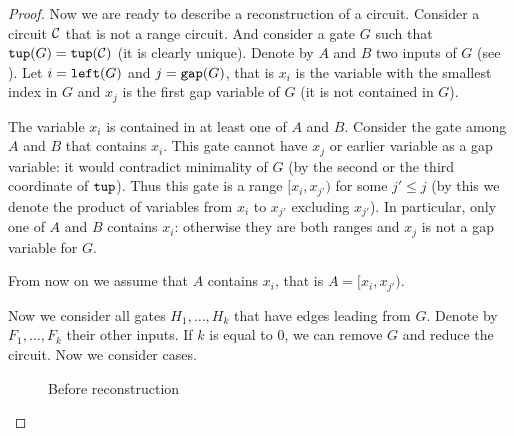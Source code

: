 \documentclass{toc}
\begin{document}
\begin{proof}[Proof]
    Now we are ready to describe a reconstruction of a circuit. Consider a circuit ${\cal C}$ that is not a range circuit. And consider a gate $G$ such that $\texttt{tup}(G)=\texttt{tup}({\cal C})$ (it is clearly unique). Denote by $A$ and $B$ two inputs of $G$ (see ). Let $i=\texttt{left}(G)$ and $j=\texttt{gap}(G)$, that is $x_i$ is the variable with the smallest index in $G$ and $x_j$ is the first gap variable of $G$ (it is not contained in $G$).

    The variable $x_i$ is contained in at least one of $A$ and $B$. Consider the gate among $A$ and $B$ that contains $x_i$. This gate cannot have $x_j$ or earlier variable as a gap variable: it would contradict minimality of $G$ (by the second or the third coordinate of $\texttt{tup}$). Thus this gate is a range $[x_i,x_{j'})$ for some $j'\leq j$ (by this we denote the product of variables from $x_i$ to $x_{j'}$ excluding $x_{j'}$). In particular, only one of $A$ and $B$ contains $x_i$: otherwise they are both ranges and $x_j$ is not a gap variable for $G$.

    From now on we assume that $A$ contains $x_i$, that is $A=[x_i,x_{j'})$.

    Now we consider all gates $H_1,\ldots, H_k$ that have edges leading from $G$. Denote by $F_1,\ldots, F_k$ their other inputs. If $k$ is equal to $0$, we can remove $G$ and reduce the circuit. Now we consider cases.

    \begin{figure}[ht]
        \begin{center}
        \end{center}
        \caption{Before reconstruction} \label{fig:before}
    \end{figure}


\end{proof}
\end{document}
